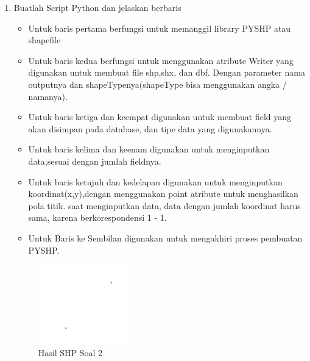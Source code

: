 \begin{enumerate}
	\item Buatlah Script Python dan jelaskan berbaris
	
	\begin{itemize}
		\item Untuk baris pertama berfungsi untuk memanggil library PYSHP atau shapefile
		\item Untuk baris kedua berfungsi untuk menggunakan atribute Writer yang digunakan untuk membuat file shp,shx, dan dbf. \hfill\break Dengan parameter nama outputnya dan shapeTypenya(shapeType bisa menggunakan angka / namanya).
		\item Untuk baris ketiga dan keempat digunakan untuk membuat field yang akan disimpan pada database, dan tipe data yang digunakannya.
		\item Untuk baris kelima dan keenam digunakan untuk menginputkan data,sesuai dengan jumlah fieldnya.
		\item Untuk baris ketujuh dan kedelapan digunakan untuk menginputkan koordinat(x,y),dengan menggunakan point atribute untuk menghasilkan pola titik. \hfill\break
		saat menginputkan data, data dengan jumlah koordinat harus sama, karena berkorespondensi 1 - 1.
		\item Untuk Baris ke Sembilan digunakan untuk mengakhiri proses pembuatan PYSHP.
	\end{itemize}
	\hfill\break
	\begin{figure}[H]
		\includegraphics[width=4cm]{figures/1174027/2/soal2.png}
		\centering
		\caption{Hasil SHP Soal 2}
	\end{figure}


\end{enumerate}
